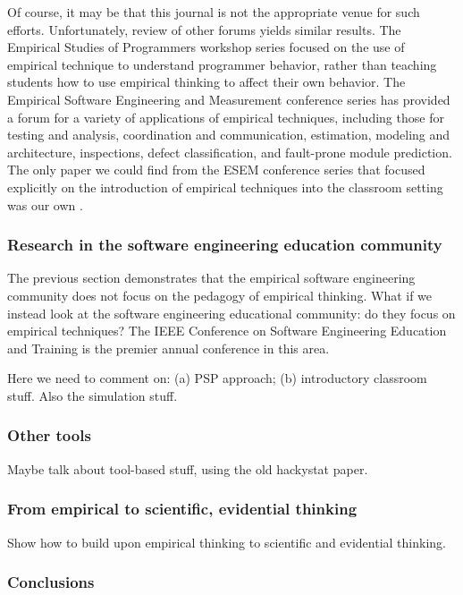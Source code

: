 Of course, it may be that this journal is not the appropriate venue for
such efforts.  Unfortunately, review of other forums yields similar
results.  The Empirical Studies of Programmers workshop series focused on
the use of empirical technique to understand programmer behavior, rather
than teaching students how to use empirical thinking to affect their own
behavior.  The Empirical Software Engineering and Measurement conference
series has provided a forum for a variety of applications of empirical
techniques, including those for testing and analysis, coordination and
communication, estimation, modeling and architecture, inspections, defect
classification, and fault-prone module prediction.  The only paper we could
find from the ESEM conference series that focused explicitly on the
introduction of empirical techniques into the classroom setting was our own
\citep{csdl2-03-12}.

\subsubsection{Research in the software engineering education community}

The previous section demonstrates that the empirical software engineering community does
not focus on the pedagogy of empirical thinking.  What if we instead look at the 
software engineering educational community: do they focus on empirical techniques? 
The IEEE Conference on Software Engineering Education and Training is the premier annual
conference in this area.  

Here we need to comment on: (a) PSP approach; (b) introductory classroom stuff.  Also the simulation stuff.  

\subsubsection{Other tools}

Maybe talk about tool-based stuff, using the old hackystat paper. 

\subsubsection{From empirical to scientific, evidential thinking}

Show how to build upon empirical thinking to scientific and evidential thinking. 

\subsubsection{Conclusions}

